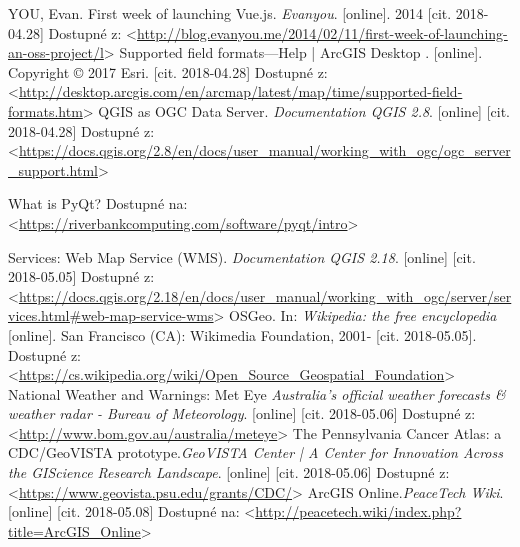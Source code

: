 \documentclass[12pt,a4paper]{article}
\begin{document}
\begin{thebibliography}{99}
YOU, Evan. First week of launching Vue.js. \textit{Evanyou}. [online]. 2014
[cit. 2018-04.28]
Dostupné z: \textless\url{http://blog.evanyou.me/2014/02/11/first-week-of-launching-an-oss-project/l}\textgreater
{}
Supported field formats—Help | ArcGIS Desktop \textit{}. [online]. Copyright © 2017 Esri.
[cit. 2018-04.28]
Dostupné z: \textless\url{http://desktop.arcgis.com/en/arcmap/latest/map/time/supported-field-formats.htm}\textgreater
{}
QGIS as OGC Data Server. \textit{Documentation QGIS 2.8}. [online]
[cit. 2018-04.28]
Dostupné z: \textless\url{https://docs.qgis.org/2.8/en/docs/user_manual/working_with_ogc/ogc_server_support.html}\textgreater

What is PyQt?\textit{}
Dostupné na: \textless\url{https://riverbankcomputing.com/software/pyqt/intro}\textgreater

Services: Web Map Service (WMS). \textit{Documentation QGIS 2.18}. [online]
[cit. 2018-05.05]
Dostupné z: \textless\url{https://docs.qgis.org/2.18/en/docs/user_manual/working_with_ogc/server/services.html#web-map-service-wms}\textgreater
{}
OSGeo. In: \textit{Wikipedia: the free encyclopedia} [online]. San Francisco (CA): Wikimedia Foundation, 2001- 
[cit. 2018-05.05]. Dostupné z: \textless\url{https://cs.wikipedia.org/wiki/Open_Source_Geospatial_Foundation}\textgreater
{}
National Weather and Warnings: Met Eye \textit{Australia's official weather forecasts \& weather radar - Bureau of Meteorology}. [online]
[cit. 2018-05.06] Dostupné z: \textless\url{http://www.bom.gov.au/australia/meteye}\textgreater
{}
The Pennsylvania Cancer Atlas: a CDC/GeoVISTA prototype.\textit{GeoVISTA Center | A Center for Innovation Across the GIScience Research Landscape}. [online] [cit. 2018-05.06]
Dostupné z: \textless\url{https://www.geovista.psu.edu/grants/CDC/}\textgreater
{}
ArcGIS Online.\textit{PeaceTech Wiki}. [online] [cit. 2018-05.08]
Dostupné na: \textless\url{http://peacetech.wiki/index.php?title=ArcGIS_Online}\textgreater
\end{thebibliography}


\end{document}

